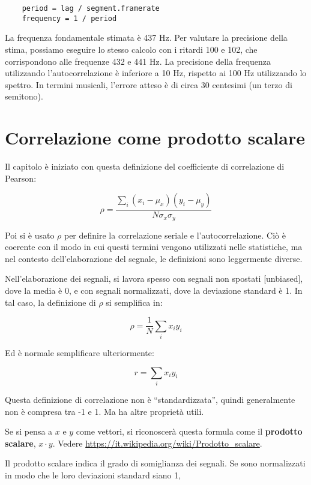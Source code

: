 \documentclass[12pt,a4paper]{book}
\begin{document}
\begin{verbatim} 
    period = lag / segment.framerate
    frequency = 1 / period
 \end{verbatim} 

La frequenza fondamentale stimata è 437 Hz. Per valutare la precisione della stima, possiamo eseguire lo stesso calcolo con i ritardi 100 e 102, che corrispondono alle frequenze 432 e 441 Hz. La precisione della frequenza utilizzando l'autocorrelazione è inferiore a 10 Hz, rispetto ai 100 Hz utilizzando lo spettro. In termini musicali, l'errore atteso è di circa 30 centesimi (un terzo di semitono).

\section{Correlazione come prodotto scalare} \label{dotproduct} 

Il capitolo è iniziato con questa definizione del coefficiente di correlazione di Pearson:

%
\[ \rho = \frac{ \sum_i (x_i - \mu_x) (y_i - \mu_y)}{N \sigma_x \sigma_y} \] 

%
Poi si è usato $\rho$ per definire la correlazione seriale e l'autocorrelazione. Ciò è coerente con il modo in cui questi termini vengono utilizzati nelle statistiche, ma nel contesto dell'elaborazione del segnale, le definizioni sono leggermente diverse.

Nell'elaborazione dei segnali, si lavora spesso con segnali non spostati [unbiased], dove la media è 0, e con segnali normalizzati, dove la deviazione standard è 1. In tal caso, la definizione di $\rho$ si semplifica in:

%
\[ \rho = \frac{1}{N} \sum_i x_i y_i \] 

%
Ed è normale semplificare ulteriormente:

%
\[ r = \sum_i x_i y_i \] 

%
Questa definizione di correlazione non è ``standardizzata'', quindi generalmente non è compresa tra -1 e 1. Ma ha altre proprietà utili.

Se si pensa a $x$ e $y$ come vettori, si riconoscerà questa formula come il {\bf prodotto scalare}, $x \cdot y$. Vedere \url{https://it.wikipedia.org/wiki/Prodotto_scalare}.

\newcommand{\norm}{\mathrm{norm}}

Il prodotto scalare indica il grado di somiglianza dei segnali. Se sono normalizzati in modo che le loro deviazioni standard siano 1,
\end{document}
